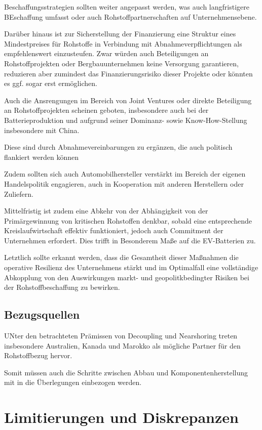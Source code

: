 \documentclass[12pt,a4paper,oneside]{book} %
\begin{document}
Beschaffungsstrategien sollten weiter angepasst werden, was auch langfristigere BEschaffung umfasst oder auch Rohstoffpartnerschaften auf Unternehmensebene.

Darüber hinaus ist zur Sicherstellung der Finanzierung eine Struktur eines Mindestpreises für Rohstoffe in Verbindung mit Abnahmeverpflichtungen als empfehlenswert einzusteufen. Zwar würden auch Beteiligungen an Rohstoffprojekten oder Bergbauunternehmen keine Versorgung garantieren, reduzieren aber zumindest das Finanzierungsrisiko dieser Projekte oder könnten es ggf. sogar erst ermöglichen.

Auch die Ansrengungen im Bereich von Joint Ventures oder direkte Beteiligung an Rohstoffprojekten scheinen geboten, insbesondere auch bei der Batterieproduktion und aufgrund seiner Dominanz- sowie Know-How-Stellung insbesondere mit China.\autocite{McBridge, S. 30} 

Diese sind durch Abnahmevereinbarungen zu ergänzen, die auch politisch flankiert werden können

Zudem sollten sich auch Automobilhersteller verstärkt im Bereich der eigenen Handelspolitik engagieren, auch in Kooperation mit anderen Herstellern oder Zuliefern.

Mittelfristig ist zudem eine Abkehr von der Abhängigkeit von der Primärgewinnung von kritischen Rohstoffen denkbar, sobald eine entsprechende Kreislaufwirtschaft effektiv funktioniert, jedoch auch Commitment der Unternehmen erfordert. Dies trifft in Besonderem Maße auf die EV-Batterien zu.

Letztlich sollte erkannt werden, dass die Gesamtheit dieser Maßnahmen die operative Resilienz des Unternehmens stärkt und im Optimalfall eine vollständige Abkopplung von den Auswirkungen markt- und geopolitkbedingter Risiken bei der Rohstoffbeschaffung zu bewirken.

\subsection{Bezugsquellen}

UNter den betrachteten Prämissen von Decoupling und Nearshoring treten insbesondere Australien, Kanada und Marokko als mögliche Partner für den Rohstoffbezug hervor.

Somit müssen auch die Schritte zwischen Abbau und Komponentenherstellung mit in die Überlegungen einbezogen werden.

\section{Limitierungen und Diskrepanzen}
\end{document}
